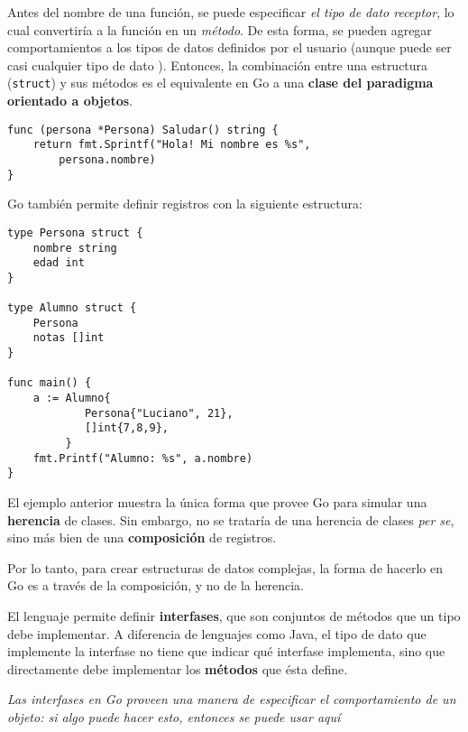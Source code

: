 Antes del nombre de una función, se puede especificar \emph{el tipo de dato receptor}, lo cual convertiría a la función en un \emph{método}. De esta forma, se pueden agregar comportamientos a los tipos de datos definidos por el usuario (aunque puede ser casi cualquier tipo de dato \autocite{TheWayToGo:Methods}). Entonces, la combinación entre una estructura (\texttt{struct}) y sus métodos es el equivalente en Go a una \textbf{clase del paradigma orientado a objetos}. 

\vspace*{5mm}
\begin{lstlisting}[title={\centering Método \emph{Saludar} para una persona (nótese que el método recibe un puntero a una persona, Go automáticamente lo dereferencia)}]
func (persona *Persona) Saludar() string {
    return fmt.Sprintf("Hola! Mi nombre es %s",
        persona.nombre)
}
\end{lstlisting}

Go también permite definir registros con la siguiente estructura:

\vspace*{5mm}
\begin{lstlisting}[title=Definición de un registro con registros embebidos (anónimo)]
type Persona struct {
    nombre string
    edad int
}

type Alumno struct {
    Persona
    notas []int
}

func main() {
    a := Alumno{
            Persona{"Luciano", 21},
            []int{7,8,9},
         }
    fmt.Printf("Alumno: %s", a.nombre)
}
\end{lstlisting}

El ejemplo anterior muestra la única forma que provee Go para simular una \textbf{herencia} de clases. Sin embargo, no se trataría de una herencia de clases \emph{per se}, sino más bien de una \textbf{composición} de registros.

Por lo tanto, para crear estructuras de datos complejas, la forma de hacerlo en Go es a través de la composición, y no de la herencia.

El lenguaje permite definir \textbf{interfases}, que son conjuntos de métodos que un tipo debe implementar. A diferencia de lenguajes como Java, el tipo de dato que implemente la interfase no tiene que indicar qué interfase implementa, sino que directamente debe implementar los \textbf{métodos} que ésta define.

\begin{displayquote}\itshape
Las interfases en Go proveen una manera de \emph{especificar el comportamiento} de un objeto: si algo puede hacer \emph{esto}, entonces se puede usar \emph{aquí} \autocite{TheWayToGo:Interfaces}   
\end{displayquote}

